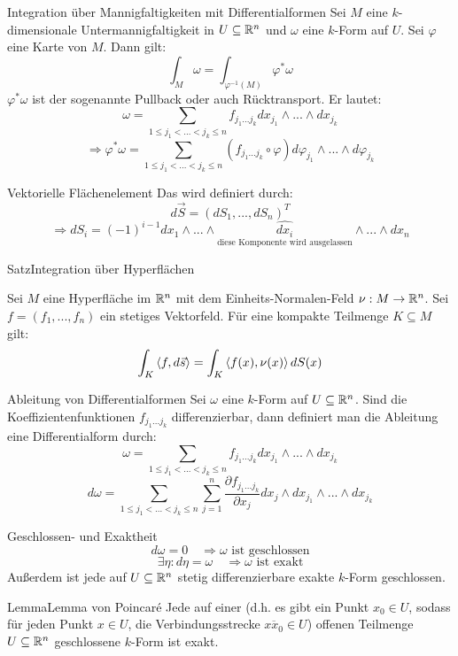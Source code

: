 \begin{Def}{Integration über Mannigfaltigkeiten mit Differentialformen}
    Sei $M$ eine $k$-dimensionale Untermannigfaltigkeit in $U\subseteq \mathbb{R}^n$ und $\omega$ eine $k$-Form auf $U$. Sei $\varphi$ eine Karte von $M$. Dann gilt:
    $$\int_M \omega = \int_{\varphi^{-1}(M)}\varphi^*\omega$$
    $\varphi^*\omega$ ist der sogenannte Pullback oder auch Rücktransport. Er lautet:
    $$\omega = \sum_{1\leq j_1 <\dots < j_k\leq n} f_{j_1...j_k}dx_{j_1}\land ...\land dx_{j_k}$$
    $$\Rightarrow \varphi^* \omega = \sum_{1\leq j_1 < ... < j_k\leq n}(f_{j_1...j_k}\circ \varphi)d\varphi_{j_1}\land ...\land d\varphi_{j_k}$$
\end{Def}
\begin{Def}{Vektorielle Flächenelement}
        Das  wird definiert durch:
    $$d\vec{S}=(dS_1, ..., dS_n)^T$$
    $$\Rightarrow dS_i=(-1)^{i-1}dx_1\land ... \land \underset{\text{diese Komponente wird ausgelassen}}{\hat{dx_i}}\land ...\land dx_n$$
\end{Def}
\begin{Satz}{Satz}{Integration über Hyperflächen}

    Sei $M$ eine Hyperfläche im $\mathbb{R}^n$ mit dem Einheits-Normalen-Feld $\nu: M\rightarrow \mathbb{R}^n$. Sei $f=(f_1, ..., f_n)$ ein stetiges Vektorfeld. Für eine kompakte Teilmenge $K\subseteq M$ gilt:
    $$\int_K \braket{f, d\vec{s}}=\int_K \braket{f(x), \nu(x)}dS(x)$$
\end{Satz}
\begin{Def}{Ableitung von Differentialformen}
    Sei $\omega$ eine $k$-Form auf $U\subseteq \mathbb{R}^n$. Sind die Koeffizientenfunktionen $f_{j_1...j_k}$ differenzierbar, dann definiert man die Ableitung eine Differentialform durch:
    $$\omega = \sum_{1\leq j_1<...<j_k\leq n} f_{j_1...j_k}dx_{j_1}\land ... \land dx_{j_k}$$
    $$d\omega = \sum_{1\leq j_1<...<j_k\leq n} \sum^n_{j=1}\frac{\partial f_{j_1...j_k}}{\partial x_j}dx_j \land dx_{j_1}\land ...\land dx_{j_k}$$
\end{Def}
\begin{Def}{Geschlossen- und Exaktheit}
    $$d\omega = 0 \quad \Rightarrow \omega \text{ ist geschlossen}$$
    $$\exists \eta: d\eta = \omega \quad \Rightarrow \omega \text{ ist exakt}$$
    Außerdem ist jede auf $U\subseteq \mathbb{R}^n$ stetig differenzierbare exakte $k$-Form geschlossen.
\end{Def}
\begin{Satz}{Lemma}{Lemma von Poincaré}
    Jede auf einer  (d.h. es gibt ein Punkt $x_0\in U$, sodass für jeden Punkt $x\in U$, die Verbindungsstrecke $\overline{xx_0}\in U$) offenen Teilmenge $U\subseteq \mathbb{R}^n$ geschlossene $k$-Form ist exakt.
\end{Satz}
